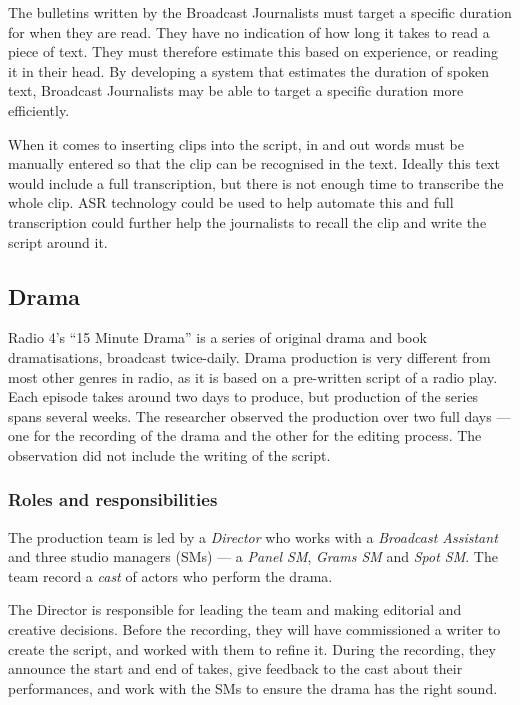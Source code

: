 The bulletins written by the Broadcast Journalists must target a specific duration for when they are read.  They have
no indication of how long it takes to read a piece of text. They must therefore estimate this based on experience, or
reading it in their head.  By developing a system that estimates the duration of spoken text, Broadcast Journalists may
be able to target a specific duration more efficiently. 

When it comes to inserting clips into the script, in and out words must be manually entered so that the clip can be
recognised in the text. Ideally this text would include a full transcription, but there is not enough time to
transcribe the whole clip.  ASR technology could be used to help automate this and full transcription could further
help the journalists to recall the clip and write the script around it.

\subsection{Drama}\label{sec:drama}
Radio 4's ``15 Minute Drama'' is a series of original drama and book dramatisations, broadcast twice-daily. Drama
production is very different from most other genres in radio, as it is based on a pre-written script of a radio play.
Each episode takes around two days to produce, but production of the series spans several weeks.  The researcher
observed the production over two full days --- one for the recording of the drama and the other for the editing process.
The observation did not include the writing of the script.

\subsubsection{Roles and responsibilities}
The production team is led by a \textit{Director} who works with a \textit{Broadcast Assistant} and three studio
managers (SMs) --- a \textit{Panel SM}, \textit{Grams SM} and \textit{Spot SM}. The team record a \textit{cast} of
actors who perform the drama.

The Director is responsible for leading the team and making editorial and creative decisions. Before the recording,
they will have commissioned a writer to create the script, and worked with them to refine it. During the recording,
they announce the start and end of takes, give feedback to the cast about their performances, and work with
the SMs to ensure the drama has the right sound.

